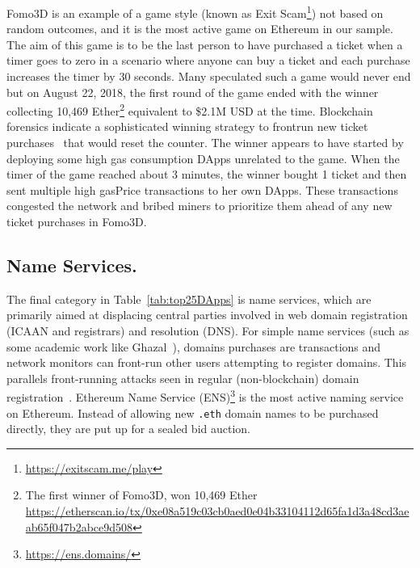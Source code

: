 \textsf{Fomo3D} is an example of a game style (known as \textsf{Exit Scam}\footnote{\url{https://exitscam.me/play}}) not based on random outcomes, and it is the most active game on Ethereum in our sample. The aim of this game is to be the last person to have purchased a ticket when a timer goes to zero in a scenario where anyone can buy a ticket and each purchase increases the timer by 30 seconds. Many speculated such a game would never end but on August 22, 2018, the first round of the game ended with the winner collecting 10,469 Ether\footnote{The first winner of Fomo3D, won 10,469 Ether \url{ https://etherscan.io/tx/0xe08a519c03cb0aed0e04b33104112d65fa1d3a48cd3aeab65f047b2abce9d508}} equivalent to \$2.1M USD at the time. 
Blockchain forensics indicate a sophisticated winning strategy to frontrun new ticket purchases~\cite{fomo3dhacker} that would reset the counter. The winner appears to have started by deploying some high gas consumption DApps unrelated to the game. When the timer of the game reached about 3 minutes, the winner bought 1 ticket and then sent multiple high gasPrice transactions to her own DApps. These transactions congested the network and bribed miners to prioritize them ahead of any new ticket purchases in \textsf{Fomo3D}. 




\subsection{Name Services.}\label{sec:ens}

The final category in Table~\ref{tab:top25DApps} is name services, which are primarily aimed at displacing central parties involved in web domain registration (\eg ICAAN and registrars) and resolution (\eg DNS). For simple name services (such as some academic work like Ghazal~\cite{moosavighazal}), domains purchases are transactions and network monitors can front-run other users attempting to register domains. This parallels front-running attacks seen in regular (non-blockchain) domain registration~\cite{sac022en33:online}. \textsf{Ethereum Name Service (ENS)}\footnote{\url{https://ens.domains/}} is the most active naming service on Ethereum. Instead of allowing new  \texttt{.eth} domain names to be purchased directly, they are put up for a sealed bid auction.  
 



